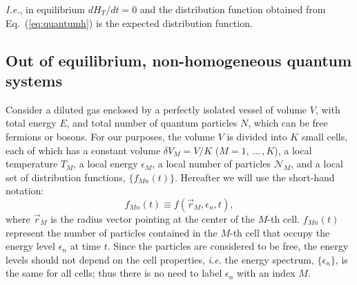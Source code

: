 \textit{I.e.}, in equilibrium $dH_T/dt=0$ and the distribution function obtained from
Eq.~(\ref{eq:quantumh}) is the expected distribution function.

\begin{comment}
In addition, Tolman also showed that (\ref{eq:quantumh}) can be reduced, in the
high-energy limit, to
%
\begin{equation}
    H_T = \sum_{\kappa} (n_{\kappa} \ln n_{\kappa} - n_{\kappa} \ln g_{\kappa}). \label{reduce-h}
\end{equation}
%
This expression also can be obtained also from the Boltzmann $H$-functional through defining
%
\begin{equation}
    f=\frac{n_{\kappa}}{ g_{\kappa}}.
\end{equation}
\end{comment}
%



\subsection{Out of equilibrium, non-homogeneous quantum systems}

Consider a diluted gas enclosed by a perfectly isolated vessel of volume $V$, with
total energy $E$, and total number of quantum particles $N$, which can be free fermions or
bosons. For our purposes, the volume $V$ is divided into $K$ small cells, each of which
has a constant volume $\delta V_M=V/K$ ($M=1,\,\dots\,,K$), a
local temperature $T_M$, a local energy $\epsilon_M$,
a local number of particles $\mathcal{N}_M$, and a local set of distribution functions,
$\{f_{Mn}(t)\}$. Hereafter we will use the short-hand notation:
%
\begin{equation}
   f_{Mn}(t)\equiv f(\vec r_M,\epsilon_{n},t),
\end{equation}
%
where $\vec r_M$ is the radius vector pointing at the center of the $M$-th cell.
$f_{Mn}(t)$ represent the number
of particles contained in the $M$-th cell that occupy the energy level $\epsilon_n$ at
time $t$. Since the particles are considered to be free, the energy levels should not
depend on the cell properties, \textit{i.e.} the energy spectrum, $\{\epsilon_n\}$, is the same for all
cells; thus there is no need to label $\epsilon_n$ with an index $M$.


